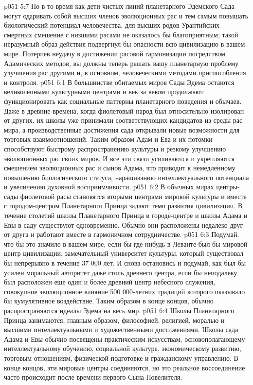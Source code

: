 \vs p051 5:7 Но в то время как дети чистых линий планетарного Эдемского Сада могут одаривать собой высших членов эволюционных рас и тем самым повышать биологический потенциал человечества, для высших родов Урантийских смертных смешение с низшими расами не оказалось бы благоприятным; такой неразумный образ действия подвергнул бы опасности всю цивилизацию в вашем мире. Потерпев неудачу в достижении расовой гармонизации посредством Адамических методов, вы должны теперь решать вашу планетарную проблему улучшения рас другими и, в основном, человеческими методами приспособления и контроля.
\vs p051 6:1 В большинстве обитаемых миров Сады Эдема остаются великолепными культурными центрами и век за веком продолжают функционировать как социальные паттерны планетарного поведения и обычаев. Даже в древние времена, когда фиолетовый народ был относительно изолирован от других, их школы уже принимали соответствующих кандидатов из среды рас мира, а производственные достижения сада открывали новые возможности для торговых взаимоотношений. Таким образом Адам и Ева и их потомки способствуют быстрому распространению культуры и резкому улучшению эволюционных рас своих миров. И все эти связи усиливаются и укрепляются смешением эволюционных рас и сынов Адама, что приводит к немедленному повышению биологического статуса, наращиванию интеллектуального потенциала и увеличению духовной восприимчивости.
\vs p051 6:2 В обычных мирах центры\hyp{}сады фиолетовой расы становятся вторыми центрами мировой культуры и вместе с городом\hyp{}центром Планетарного Принца задают темп развития цивилизации. В течение столетий школы Планетарного Принца в городе\hyp{}центре и школы Адама и Евы в саду существуют одновременно. Обычно они расположены недалеко друг от друга и работают вместе в гармоничном сотрудничестве.
\vs p051 6:3 Подумай, что бы это значило в вашем мире, если бы где\hyp{}нибудь в Леванте был бы мировой центр цивилизации, замечательный университет культуры, который существовал бы непрерывно в течение 37 000 лет. И снова остановись и подумай, как был бы усилен моральный авторитет даже столь древнего центра, если бы неподалеку был расположен еще один и более древний центр небесного служения, совокупное эволюционное влияние 500 000\hyp{}летних традиций которого оказывало бы кумулятивное воздействие. Таким образом в конце концов, обычно распространяются идеалы Эдема на весь мир.
\vs p051 6:4 Школы Планетарного Принца занимаются, главным образом, философией, религией, моралью и высшими интеллектуальными и художественными достижениями. Школы сада Адама и Евы обычно посвящены практическим искусствам, основополагающему интеллектуальному обучению, социальной культуре, экономическому развитию, торговым отношениям, физической подготовке и гражданскому управлению. В конце концов, эти мировые центры соединяются, но это реальное воссоединение часто происходит после времени первого Сына\hyp{}Повелителя.
